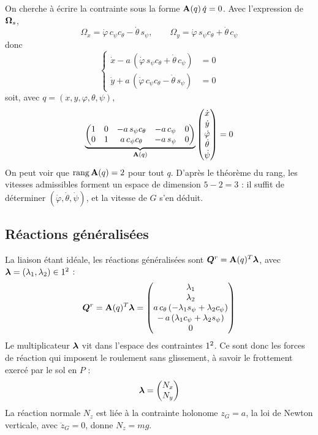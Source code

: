 On cherche à écrire la contrainte sous la forme
$\mathbf{A}(q)\,\dot q = 0$. Avec l'expression de $\bm{\Omega}_s$,
\[
    \Omega_x = \dot\varphi\,c_\psi c_\theta - \dot\theta\,s_\psi,
    \qquad
    \Omega_y = \dot\varphi\,s_\psi c_\theta + \dot\theta\,c_\psi
\]
donc
\[
    \left\{
    \begin{aligned}
        \dot x - a\,(\dot\varphi\,s_\psi c_\theta
            + \dot\theta\,c_\psi) &= 0\\
        \dot y + a\,(\dot\varphi\,c_\psi c_\theta
            - \dot\theta\,s_\psi) &= 0
    \end{aligned}
    \right.
\]
soit, avec $q = (x,y,\varphi,\theta,\psi)$,
\[
    \underbrace{\begin{pmatrix}
        1 & 0 & -a\,s_\psi c_\theta & -a\,c_\psi & 0\\
        0 & 1 & a\,c_\psi c_\theta & -a\,s_\psi & 0
    \end{pmatrix}}_{\mathbf{A}(q)}
    \begin{pmatrix}
        \dot x\\ \dot y\\ \dot\varphi\\ \dot\theta\\ \dot\psi
    \end{pmatrix}
    = 0
\]
On peut voir que $\operatorname{rang}\mathbf{A}(q) = 2$ pour tout
$q$. D'après le théorème du rang, les vitesses admissibles forment un
espace de dimension $5 - 2 = 3$ : il suffit de déterminer
$(\dot\varphi,\dot\theta,\dot\psi)$, et la vitesse de $G$ s'en
déduit.


\subsection{Réactions généralisées}

La liaison étant idéale, les réactions généralisées sont
$\bm{Q}^r = \mathbf{A}(q)^T\bm{\lambda}$, avec
$\bm{\lambda} = (\lambda_1,\lambda_2)\in1^2$ :
\[
    \bm{Q}^r = \mathbf{A}(q)^T\bm{\lambda}
    = \begin{pmatrix}
        \lambda_1\\
        \lambda_2\\
        a\,c_\theta\,(-\lambda_1 s_\psi + \lambda_2 c_\psi)\\
        -\,a\,(\lambda_1 c_\psi + \lambda_2 s_\psi)\\
        0
    \end{pmatrix}
\]
Le multiplicateur $\bm{\lambda}$ vit dans l'espace des contraintes
$1^2$. Ce sont donc les forces de réaction qui imposent le roulement sans
glissement, à savoir le frottement exercé par le sol en $P$ :
\[
    \bm{\lambda} = \begin{pmatrix} N_x\\ N_y \end{pmatrix}
\]
La réaction normale $N_z$ est liée à la contrainte holonome
$z_G = a$, la loi de Newton verticale, avec
$\ddot z_G = 0$, donne $N_z = m g$.

